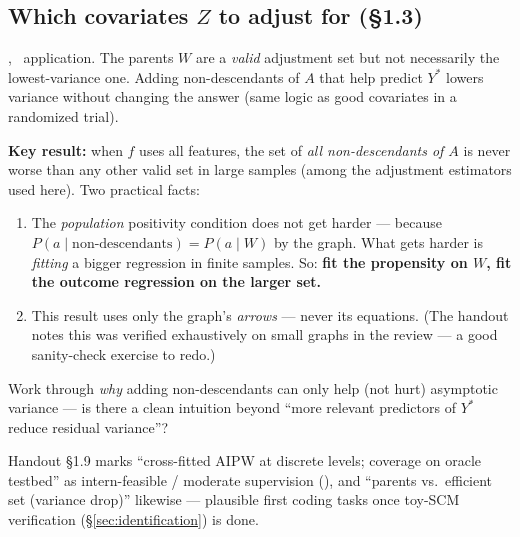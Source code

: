 \subsection{Which covariates \texorpdfstring{$Z$}{Z} to adjust for (\S1.3)}

, \newtag~application. The parents $W$
are a \emph{valid} adjustment set but not necessarily the lowest-variance
one. Adding non-descendants of $A$ that help predict $Y^*$ lowers variance
without changing the answer (same logic as good covariates in a randomized
trial).

\textbf{Key result:} when $f$ uses all features, the set of \emph{all
non-descendants of $A$} is never worse than any other valid set in large
samples (among the adjustment estimators used here). Two practical facts:
\begin{enumerate}[label=(\alph*)]
  \item The \emph{population} positivity condition does not get harder ---
    because $P(a \mid \text{non-descendants}) = P(a \mid W)$ by the graph.
    What gets harder is \emph{fitting} a bigger regression in finite
    samples. So: \textbf{fit the propensity on $W$, fit the outcome
    regression on the larger set.}
  \item This result uses only the graph's \emph{arrows} --- never its
    equations. (The handout notes this was verified exhaustively on small
    graphs in the review --- a good sanity-check exercise to redo.)
\end{enumerate}

\begin{openquestions}
  \item Work through \emph{why} adding non-descendants can only help (not
    hurt) asymptotic variance --- is there a clean intuition beyond ``more
    relevant predictors of $Y^*$ reduce residual variance''?
  \item Handout \S1.9 marks ``cross-fitted AIPW at discrete levels; coverage
    on oracle testbed'' as intern-feasible / moderate supervision
    (\feasmod), and ``parents vs.\ efficient set (variance drop)'' likewise
    --- plausible first coding tasks once toy-SCM verification
    (\S\ref{sec:identification}) is done.
\end{openquestions}
